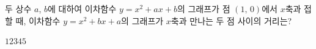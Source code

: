 두 상수 $a$, $b$에 대하여 이차함수 $y=x^2+ax+b$의 그래프가 점 $(1,\,0)$에서 $x$축과 접할 때, 이차함수 $y=x^2+bx+a$의 그래프가 $x$축과 만나는 두 점 사이의 거리는?
\begin{choices32}{$1$}{$2$}{$3$}{$4$}{$5$}\end{choices32}

